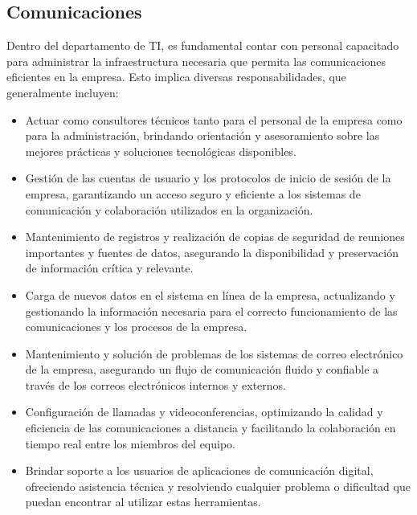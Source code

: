 \documentclass{article}
\begin{document}
\subsection{Comunicaciones}
Dentro del departamento de TI, es fundamental contar con personal capacitado para administrar la infraestructura necesaria que permita las comunicaciones eficientes en la empresa. Esto implica diversas responsabilidades, que generalmente incluyen:
\begin{itemize}[label=$\circ$]
    \item Actuar como consultores técnicos tanto para el personal de la empresa como para la administración, brindando orientación y asesoramiento sobre las mejores prácticas y soluciones tecnológicas disponibles.
    \item Gestión de las cuentas de usuario y los protocolos de inicio de sesión de la empresa, garantizando un acceso seguro y eficiente a los sistemas de comunicación y colaboración utilizados en la organización.
    \item Mantenimiento de registros y realización de copias de seguridad de reuniones importantes y fuentes de datos, asegurando la disponibilidad y preservación de información crítica y relevante.
    \item Carga de nuevos datos en el sistema en línea de la empresa, actualizando y gestionando la información necesaria para el correcto funcionamiento de las comunicaciones y los procesos de la empresa.
    \item Mantenimiento y solución de problemas de los sistemas de correo electrónico de la empresa, asegurando un flujo de comunicación fluido y confiable a través de los correos electrónicos internos y externos.
    \item Configuración de llamadas y videoconferencias, optimizando la calidad y eficiencia de las comunicaciones a distancia y facilitando la colaboración en tiempo real entre los miembros del equipo.
    \item Brindar soporte a los usuarios de aplicaciones de comunicación digital, ofreciendo asistencia técnica y resolviendo cualquier problema o dificultad que puedan encontrar al utilizar estas herramientas.
\end{itemize}
\end{document}
